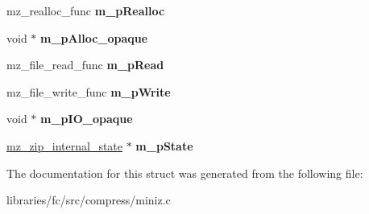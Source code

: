 \begin{DoxyCompactItemize}
mz\+\_\+realloc\+\_\+func {\bfseries m\+\_\+p\+Realloc}
\item 
\mbox{\label{structmz__zip__archive__tag_abc59b536ad84bfc23fd8dd6fb80e5821}} 
void $\ast$ {\bfseries m\+\_\+p\+Alloc\+\_\+opaque}
\item 
\mbox{\label{structmz__zip__archive__tag_aaeb0dd8a865fd776e32b463b3183d3d7}} 
mz\+\_\+file\+\_\+read\+\_\+func {\bfseries m\+\_\+p\+Read}
\item 
\mbox{\label{structmz__zip__archive__tag_a55b7f9913bcd74aec667315e4598df0c}} 
mz\+\_\+file\+\_\+write\+\_\+func {\bfseries m\+\_\+p\+Write}
\item 
\mbox{\label{structmz__zip__archive__tag_afe6dbd172dd42b80adb4b2dbc3a310fa}} 
void $\ast$ {\bfseries m\+\_\+p\+I\+O\+\_\+opaque}
\item 
\mbox{\label{structmz__zip__archive__tag_aad50c7d0c1f23497a2d8648371c64ec8}} 
\mbox{\hyperlink{structmz__zip__internal__state__tag}{mz\+\_\+zip\+\_\+internal\+\_\+state}} $\ast$ {\bfseries m\+\_\+p\+State}
\end{DoxyCompactItemize}


The documentation for this struct was generated from the following file\+:\begin{DoxyCompactItemize}
\item 
libraries/fc/src/compress/miniz.\+c\end{DoxyCompactItemize}
